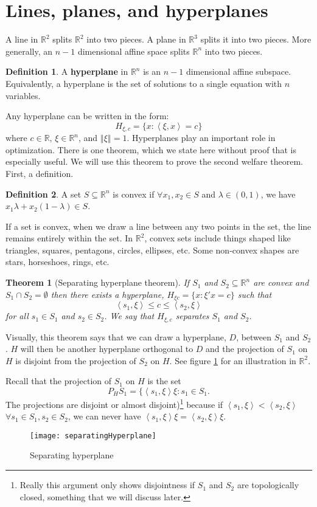 \documentclass[12pt,reqno]{amsart}
\newtheorem{theorem}{Theorem}[section]
\theoremstyle{definition}
\newtheorem{definition}{Definition}[section]
\def\R{\mathbb{R}}
\newcommand{\iprod}[2]{\left\langle {#1} , {#2} \right\rangle}
\newcommand{\norm}[1]{\left\Vert {#1} \right\Vert}
\begin{document}
\section{Lines, planes, and hyperplanes }

A line in $\R^2$ splits $\R^2$ into two pieces. A plane in $\R^3$
splits it into two pieces. More generally, an $n-1$ dimensional
affine space splits $\R^n$ into two pieces.
\begin{definition}
  A \textbf{hyperplane} in $\R^n$ is an $n-1$ dimensional affine
  subspace. Equivalently, a hyperplane is the set of solutions to a
  single equation with $n$ variables.
\end{definition}
Any hyperplane can be written in the form:
\[ H_{\xi,c} = \{x: \iprod{\xi}{x} = c \} \] where $c \in \R$, $\xi \in
\R^n$, and $\norm{\xi} = 1$.  Hyperplanes play an important role in
optimization. There is one theorem, which we state here without proof
that is especially useful.  We will use this theorem to prove the
second welfare theorem. First, a definition.
\begin{definition}
  A set $S \subseteq \R^n$ is convex if $\forall x_1, x_2 \in S$ and
  $\lambda \in (0,1)$, we have $x_1 \lambda + x_2(1-\lambda) \in S$.  
\end{definition}
If a set is convex, when we draw a line between any two points in the
set, the line remains entirely within the set.  In $\R^2$, convex sets
include things shaped like triangles, squares, pentagons, circles,
ellipses, etc. Some non-convex shapes are stars, horseshoes, rings,
etc.
\begin{theorem}[Separating hyperplane theorem] \label{thm:sht}
  If $S_1$ and $S_2 \subseteq \R^n$ are convex and $S_1 \cap S_2 =
  \emptyset$ then there exists a hyperplane, $H_{\xi c} = \{ x: \xi'x
  = c \}$ such that  
  \[ \iprod{s_1}{\xi} \leq c \leq \iprod{s_2}{\xi} \]
  for all $s_1 \in S_1$ and $s_2 \in S_2$. We say that $H_{\xi,c}$
  separates $S_1$ and $S_2$. 
\end{theorem}
Visually, this theorem says that we can draw a hyperplane, $D$,
between $S_1$ and $S_2$. $H$ will then be another hyperplane
orthogonal to $D$ and the projection of $S_1$ on $H$ is disjoint from
the projection of $S_2$ on $H$. See figure \ref{fig:sht} for an
illustration in $\R^2$.

Recall that the projection of $S_1$ on $H$ is the set
\[ P_H S_1 = \{ \iprod{s_1}{\xi}\xi : s_1 \in S_1. \] The projections
are disjoint or almost disjoint)\footnote{Really this argument only
  shows disjointness if $S_1$ and $S_2$ are topologically
  closed, something that we will discuss later.} because if
$\iprod{s_1}{\xi} < \iprod{s_2}{\xi}$ $\forall s_1 \in S_1, s_2 \in
S_2$, we can never have $\iprod{s_1}{\xi}\xi = \iprod{s_2}{\xi}\xi $.
\begin{figure}\caption{Separating hyperplane \label{fig:sht}}
  \begin{centering}
    \texttt{[image: separatingHyperplane]}
  \end{centering}
\end{figure}
\end{document}
